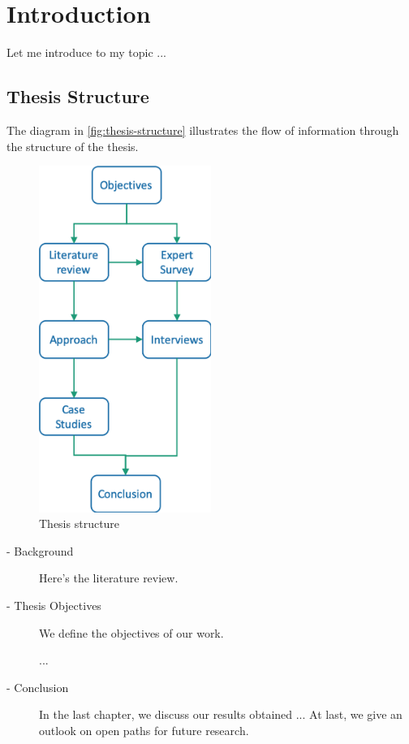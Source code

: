\chapter{Introduction}

Let me introduce to my topic ...


\section{Thesis Structure}
The diagram in \autoref{fig:thesis-structure} illustrates the flow of information through the structure of the thesis.

\begin{figure}[htb!]
\centering \includegraphics[width=0.5\textwidth]{graphics/thesis-structure}
\caption{Thesis structure}
\label{fig:thesis-structure}
\end{figure}

\begin{description}
    \item[ - Background]
Here's the literature review.

    \item[ - Thesis Objectives]
We define the objectives of our work.

...

    \item[ - Conclusion]
In the last chapter, we discuss our results obtained ...
At last, we give an outlook on open paths for future research.

\end{description}

